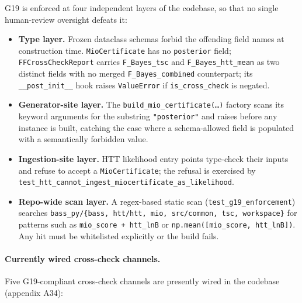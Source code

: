 G19 is enforced at four independent layers of the codebase,
so that no single human-review oversight defeats it:

\begin{itemize}
\item \textbf{Type layer.}  Frozen dataclass schemas forbid
  the offending field names at construction time.
  \texttt{MioCertificate} has no \texttt{posterior} field;
  \texttt{FFCrossCheckReport} carries
  \texttt{F\_Bayes\_tsc} and \texttt{F\_Bayes\_htt\_mean} as
  two distinct fields with no merged
  \texttt{F\_Bayes\_combined} counterpart; its
  \texttt{\_\_post\_init\_\_} hook raises
  \texttt{ValueError} if \texttt{is\_cross\_check} is
  negated.
\item \textbf{Generator-site layer.}  The
  \texttt{build\_mio\_certificate(\dots)} factory scans its
  keyword arguments for the substring \texttt{"posterior"}
  and raises before any instance is built, catching the case
  where a schema-allowed field is populated with a
  semantically forbidden value.
\item \textbf{Ingestion-site layer.}  HTT likelihood entry
  points type-check their inputs and refuse to accept a
  \texttt{MioCertificate}; the refusal is exercised by
  \texttt{test\_htt\_cannot\_ingest\_miocertificate\_as\_likelihood}.
\item \textbf{Repo-wide scan layer.}  A regex-based static
  scan (\texttt{test\_g19\_enforcement}) searches
  \texttt{bass\_py/\{bass, htt/htt, mio, src/common, tsc,
  workspace\}} for patterns such as
  \texttt{mio\_score + htt\_lnB} or
  \texttt{np.mean([mio\_score, htt\_lnB])}.  Any hit must be
  whitelisted explicitly or the build fails.
\end{itemize}


\paragraph{Currently wired cross-check channels.}

Five G19-compliant cross-check channels are presently wired
in the codebase (appendix A34):

